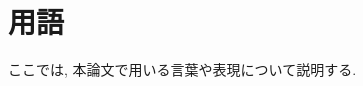 \documentclass[../../main]{subfiles}
\begin{document}
    \section{用語}\label{sec:phraseology}

    ここでは, 本論文で用いる言葉や表現について説明する.

    

    

    

    

    

    

    

    

    

    

    

    

    

    \clearpage
\end{document}

